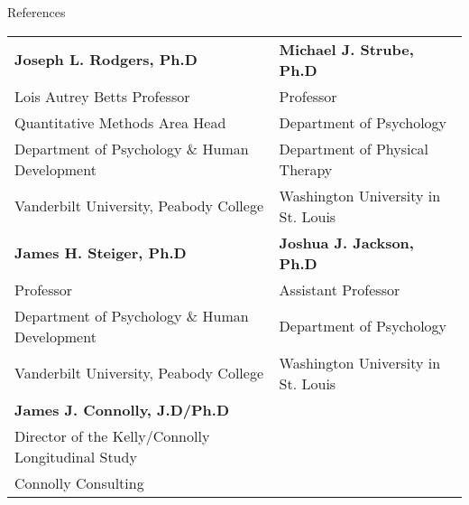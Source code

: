 \documentclass {resume}
\begin{document}
\begin{samepage}\begin{rSection}{\textrm{References}}
\begin{tabular}{ l l }
\textbf{Joseph L. Rodgers, Ph.D} & \textbf{Michael J. Strube, Ph.D}\\
Lois Autrey Betts Professor & Professor\\
Quantitative Methods Area Head & Department of Psychology\\
Department of Psychology $\&$ Human Development & Department of Physical Therapy\\
Vanderbilt University, Peabody College & Washington University in St. Louis\bigskip\\

\textbf{James H. Steiger, Ph.D} & \textbf{Joshua J. Jackson, Ph.D}\\
Professor & Assistant Professor\\
Department of Psychology $\&$ Human Development & Department of Psychology\\
Vanderbilt University, Peabody College & Washington University in St. Louis\bigskip\\
\textbf{James J. Connolly, J.D/Ph.D} 
\\
Director of the Kelly/Connolly Longitudinal Study\\ 
Connolly Consulting\\
%
\end{tabular}\end{rSection}\end{samepage}
\end{document}
